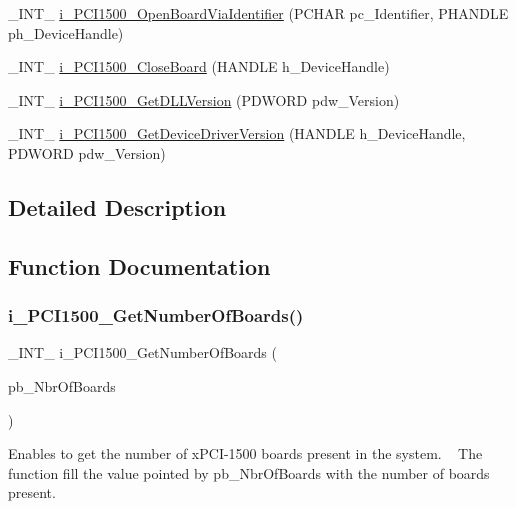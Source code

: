 \begin{DoxyCompactItemize}
\item 
\+\_\+\+I\+N\+T\+\_\+ \mbox{\hyperlink{group___general_gaf9f936b30e3104527a05a668d4b05b8c}{i\+\_\+\+P\+C\+I1500\+\_\+\+Open\+Board\+Via\+Identifier}} (P\+C\+H\+AR pc\+\_\+\+Identifier, P\+H\+A\+N\+D\+LE ph\+\_\+\+Device\+Handle)
\item 
\+\_\+\+I\+N\+T\+\_\+ \mbox{\hyperlink{group___general_gae1dbe5b9d73f401370318ea684796b68}{i\+\_\+\+P\+C\+I1500\+\_\+\+Close\+Board}} (H\+A\+N\+D\+LE h\+\_\+\+Device\+Handle)
\item 
\+\_\+\+I\+N\+T\+\_\+ \mbox{\hyperlink{group___general_ga0ddc2b5875603b239ed35ff451099799}{i\+\_\+\+P\+C\+I1500\+\_\+\+Get\+D\+L\+L\+Version}} (P\+D\+W\+O\+RD pdw\+\_\+\+Version)
\item 
\+\_\+\+I\+N\+T\+\_\+ \mbox{\hyperlink{group___general_ga6f3015889b492606932ba26a945b918c}{i\+\_\+\+P\+C\+I1500\+\_\+\+Get\+Device\+Driver\+Version}} (H\+A\+N\+D\+LE h\+\_\+\+Device\+Handle, P\+D\+W\+O\+RD pdw\+\_\+\+Version)
\end{DoxyCompactItemize}


\subsection{Detailed Description}


\subsection{Function Documentation}
\mbox{\label{group___general_ga62f69d2b4936fc6cfe75c6ee032d1f58}} 
\subsubsection{\texorpdfstring{i\_PCI1500\_GetNumberOfBoards()}{i\_PCI1500\_GetNumberOfBoards()}}
{\footnotesize\ttfamily \+\_\+\+I\+N\+T\+\_\+ i\+\_\+\+P\+C\+I1500\+\_\+\+Get\+Number\+Of\+Boards (\begin{DoxyParamCaption}\item[{P\+B\+Y\+TE}]{pb\+\_\+\+Nbr\+Of\+Boards }\end{DoxyParamCaption})}

Enables to get the number of x\+P\+C\+I-\/1500 boards present in the system. ~\newline
The function fill the value pointed by pb\+\_\+\+Nbr\+Of\+Boards with the number of boards present.


